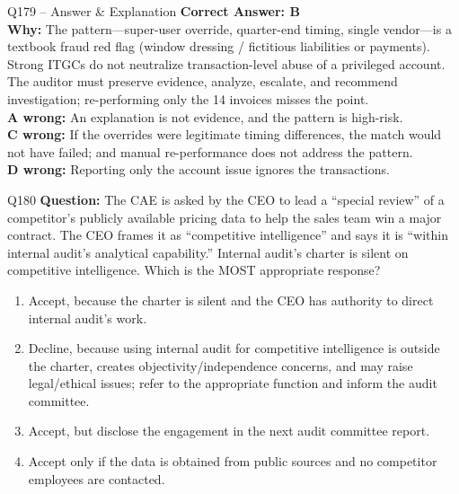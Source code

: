 \documentclass[aspectratio=169,10pt]{beamer}
\begin{document}
	\begin{frame}[t]{Q179 -- Answer \& Explanation}
		\small
		\textbf{Correct Answer: B} \\[4pt]
		\textbf{Why:} The pattern---super-user override, quarter-end timing, single vendor---is a textbook fraud red flag (window dressing / fictitious liabilities or payments). Strong ITGCs do not neutralize transaction-level abuse of a privileged account. The auditor must preserve evidence, analyze, escalate, and recommend investigation; re-performing only the 14 invoices misses the point. \\[4pt]
		\textbf{A wrong:} An explanation is not evidence, and the pattern is high-risk. \\[2pt]
		\textbf{C wrong:} If the overrides were legitimate timing differences, the match would not have failed; and manual re-performance does not address the pattern. \\[2pt]
		\textbf{D wrong:} Reporting only the account issue ignores the transactions.
	\end{frame}
	
	\begin{frame}[t]{Q180}
		\small
		\textbf{Question:} The CAE is asked by the CEO to lead a ``special review'' of a competitor's publicly available pricing data to help the sales team win a major contract. The CEO frames it as ``competitive intelligence'' and says it is ``within internal audit's analytical capability.'' Internal audit's charter is silent on competitive intelligence. Which is the MOST appropriate response?
		\begin{enumerate}[label=\Alph*.,itemsep=1pt,topsep=2pt]
			\item Accept, because the charter is silent and the CEO has authority to direct internal audit's work.
			\item Decline, because using internal audit for competitive intelligence is outside the charter, creates objectivity/independence concerns, and may raise legal/ethical issues; refer to the appropriate function and inform the audit committee.
			\item Accept, but disclose the engagement in the next audit committee report.
			\item Accept only if the data is obtained from public sources and no competitor employees are contacted.
		\end{enumerate}
	\end{frame}
	
\end{document}

